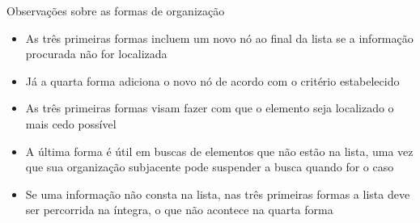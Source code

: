 \begin{frame}[fragile]{Observações sobre as formas de organização}

    \begin{itemize}
        \item As três primeiras formas incluem um novo nó ao final da lista se a informação
            procurada não for localizada

        \item Já a quarta forma adiciona o novo nó de acordo com o critério estabelecido

        \item As três primeiras formas visam fazer com que o elemento seja localizado o mais
            cedo possível

        \item A última forma é útil em buscas de elementos que não estão na lista, uma vez que
            sua organização subjacente pode suspender a busca quando for o caso

        \item Se uma informação não consta na lista, nas três primeiras formas a lista deve ser
            percorrida na íntegra, o que não acontece na quarta forma
    \end{itemize}

\end{frame}

